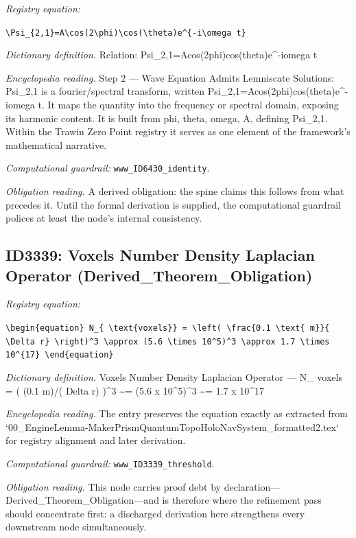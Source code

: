 \documentclass[11pt]{article}
\theoremstyle{remark}
\begin{document}
\noindent\textit{Registry equation:}\par
{\small\texttt{\textbackslash{}Psi\_\{2,1\}=A\textbackslash{}cos(2\textbackslash{}phi)\textbackslash{}cos(\textbackslash{}theta)e\textasciicircum{}\{-i\textbackslash{}omega t\}}}\par\medskip
\noindent\textit{Dictionary definition.} Relation: Psi\_2,1=Acos(2phi)cos(theta)e\textasciicircum{}-iomega t\par\medskip
\noindent\textit{Encyclopedia reading.} Step 2 --- Wave Equation Admits Lemniscate Solutions: Psi\_2,1 is a fourier/spectral transform, written Psi\_2,1=Acos(2phi)cos(theta)e\textasciicircum{}-iomega t. It maps the quantity into the frequency or spectral domain, exposing its harmonic content. It is built from phi, theta, omega, A, defining Psi\_2,1. Within the Trawin Zero Point registry it serves as one element of the framework's mathematical narrative.
\par\medskip\noindent\textit{Computational guardrail:} \texttt{www\_ID6430\_identity}.
\par\medskip\noindent\textit{Obligation reading.} A derived obligation: the spine claims this follows from what precedes it. Until the formal derivation is supplied, the computational guardrail polices at least the node's internal consistency.

\subsection{ID3339: Voxels Number Density Laplacian Operator (Derived\_Theorem\_Obligation)}

\noindent\textit{Registry equation:}\par
{\small\texttt{\textbackslash{}begin\{equation\} N\_\{ \textbackslash{}text\{voxels\}\} = \textbackslash{}left( \textbackslash{}frac\{0.1 \textbackslash{}text\{ m\}\}\{ \textbackslash{}Delta r\} \textbackslash{}right)\textasciicircum{}3 \textbackslash{}approx (5.6 \textbackslash{}times 10\textasciicircum{}5)\textasciicircum{}3 \textbackslash{}approx 1.7 \textbackslash{}times 10\textasciicircum{}\{17\} \textbackslash{}end\{equation\}}}\par\medskip
\noindent\textit{Dictionary definition.} Voxels Number Density Laplacian Operator --- N\_ voxels = ( (0.1 m)/( Delta r) )\textasciicircum{}3 \textasciitilde{}= (5.6 x 10\textasciicircum{}5)\textasciicircum{}3 \textasciitilde{}= 1.7 x 10\textasciicircum{}17\par\medskip
\noindent\textit{Encyclopedia reading.} The entry preserves the equation exactly as extracted from `00\_EngineLemma-MakerPrismQuantumTopoHoloNavSystem\_formatted2.tex` for registry alignment and later derivation.
\par\medskip\noindent\textit{Computational guardrail:} \texttt{www\_ID3339\_threshold}.
\par\medskip\noindent\textit{Obligation reading.} This node carries proof debt by declaration---Derived\_Theorem\_Obligation---and is therefore where the refinement pass should concentrate first: a discharged derivation here strengthens every downstream node simultaneously.
\end{document}
